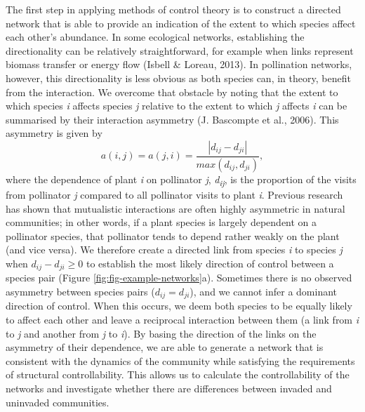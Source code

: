 \documentclass[a4paper]{artikel1}
\theoremstyle{definition}
\theoremstyle{definition}
\theoremstyle{definition}
\theoremstyle{remark}
\begin{document}
The first step in applying methods of control theory is to construct a
directed network that is able to provide an indication of the extent to
which species affect each other's abundance. In some ecological
networks, establishing the directionality can be relatively
straightforward, for example when links represent biomass transfer or
energy flow (Isbell \& Loreau, 2013). In pollination networks, however,
this directionality is less obvious as both species can, in theory,
benefit from the interaction. We overcome that obstacle by noting that
the extent to which species \emph{i} affects species \emph{j} relative
to the extent to which \emph{j} affects \emph{i} can be summarised by
their interaction asymmetry (J. Bascompte et al., 2006). This asymmetry
is given by
\[a(i,j) = a(j,i) = \frac{\left | d_{ij}-d_{ji} \right |}{max\left ( d_{ij}, d_{ji} \right )},\]
where the dependence of plant \emph{i} on pollinator \emph{j},
\emph{d\textsubscript{ij}}, is the proportion of the visits from
pollinator \emph{j} compared to all pollinator visits to plant \emph{i}.
Previous research has shown that mutualistic interactions are often
highly asymmetric in natural communities; in other words, if a plant
species is largely dependent on a pollinator species, that pollinator
tends to depend rather weakly on the plant (and vice versa). We
therefore create a directed link from species \emph{i} to species
\emph{j} when \(d_{ij}-d_{ji} \geq 0\) to establish the most likely
direction of control between a species pair (Figure
\ref{fig:fig-example-networks}a). Sometimes there is no observed
asymmetry between species pairs (\(d_{ij}=d_{ji}\)), and we cannot infer
a dominant direction of control. When this occurs, we deem both species
to be equally likely to affect each other and leave a reciprocal
interaction between them (a link from \emph{i} to \emph{j} and another
from \emph{j} to \emph{i}). By basing the direction of the links on the
asymmetry of their dependence, we are able to generate a network that is
consistent with the dynamics of the community while satisfying the
requirements of structural controllability. This allows us to calculate
the controllability of the networks and investigate whether there are
differences between invaded and uninvaded communities.
\end{document}
